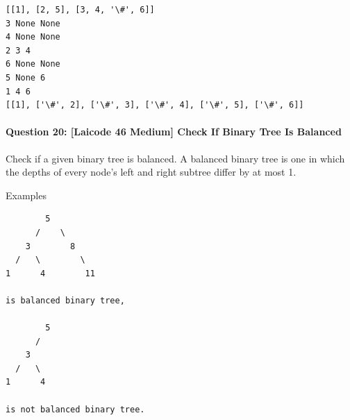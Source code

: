 \documentclass[11pt]{article}
\begin{document}
    \begin{Verbatim}[commandchars=\\\{\}]
[[1], [2, 5], [3, 4, '\#', 6]]
3 None None
4 None None
2 3 4
6 None None
5 None 6
1 4 6
[[1], ['\#', 2], ['\#', 3], ['\#', 4], ['\#', 5], ['\#', 6]]

    \end{Verbatim}

    \paragraph{Question 20: {[}Laicode 46 Medium{]} Check If Binary Tree Is
Balanced}\label{question-20-laicode-46-medium-check-if-binary-tree-is-balanced}

Check if a given binary tree is balanced. A balanced binary tree is one
in which the depths of every node's left and right subtree differ by at
most 1.

Examples

\begin{verbatim}
        5
      /    \
    3        8
  /   \        \
1      4        11

is balanced binary tree,

        5
      /
    3
  /   \
1      4

is not balanced binary tree.
\end{verbatim}
\end{document}
